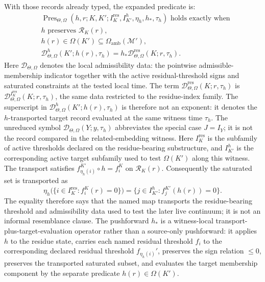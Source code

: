 With those records already typed, the expanded predicate is:
\[
\begin{aligned}
&\operatorname{Pres}_{\Theta,\Omega}
  (h,r;K,K';I_K^{\mathrm{res}},I_{K'}^{h},\eta_h,h_\ast,\tau_h)
  \text{ holds exactly when}\\
&h \text{ preserves } \mathcal{R}_K(r),\\
&h(r)\in\Omega(K')\subseteq\Omega_{\mathrm{amb}}(\mathcal{M}'),\\
&\mathcal{D}^{h}_{\Theta,\Omega}(K';h(r),\tau_h)
  =h_{\ast}\mathcal{D}^{\mathrm{res}}_{\Theta,\Omega}(K;r,\tau_h).
\end{aligned}
\]
Here \(\mathcal{D}_{\Theta,\Omega}\) denotes the local admissibility data:
the pointwise admissible-membership indicator together with the active residual-threshold signs
and saturated constraints at the tested local time. The term
\(\mathcal{D}^{\mathrm{res}}_{\Theta,\Omega}(K;r,\tau_h)\) is
\(\mathcal{D}^{I_K^{\mathrm{res}}}_{\Theta,\Omega}(K;r,\tau_h)\), the same
data restricted to the residue-index family. The superscript in
\(\mathcal{D}^{h}_{\Theta,\Omega}(K';h(r),\tau_h)\) is therefore not an
exponent: it denotes the \(h\)-transported target record evaluated at the same
witness time \(\tau_h\). The unreduced symbol
\(\mathcal{D}_{\Theta,\Omega}(Y;y,\tau_h)\) abbreviates the special case
\(J=I_Y\); it is not the record compared in the related-embedding witness.
Here \(I_K^{\mathrm{res}}\) is the subfamily of active thresholds declared on
the residue-bearing substructure, and \(I_{K'}^{h}\) is the corresponding
active target subfamily used to test \(\Omega(K')\) along this witness. The
transport satisfies
\(f_{\eta_h(i)}^{K'}\circ h=f_i^K\) on \(\mathcal{R}_K(r)\).
Consequently the saturated set is transported as
\[
  \eta_h\bigl(\{i\in I_K^{\mathrm{res}}:f_i^K(r)=0\}\bigr)
  =
  \{j\in I_{K'}^{h}:f_j^{K'}(h(r))=0\}.
\]
The equality therefore says that the named map
transports the residue-bearing threshold and admissibility data used to test
the later live continuum; it is not an informal resemblance clause. The
pushforward \(h_{\ast}\) is a witness-local transport-plus-target-evaluation
operator rather than a source-only pushforward: it applies \(h\) to the residue
state, carries each named residual threshold \(f_i\) to the corresponding
declared residual threshold \(f_{\eta_h(i)}'\), preserves the sign relation
\(\le 0\), preserves the transported saturated subset, and evaluates the
target membership component by the separate predicate
\(h(r)\in\Omega(K')\).

